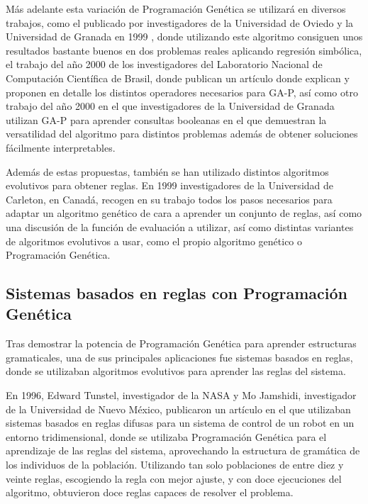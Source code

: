 Más adelante esta variación de Programación Genética se utilizará en diversos trabajos, como el publicado por investigadores de la Universidad de Oviedo y la Universidad de Granada en 1999 \cite{GAPredElectrica}, donde utilizando este algoritmo consiguen unos resultados bastante buenos en dos problemas reales aplicando regresión simbólica, el trabajo del año 2000 de los investigadores del Laboratorio Nacional de Computación Científica de Brasil, donde publican un artículo \cite{PGregresionSimbolica} donde explican y proponen en detalle los distintos operadores necesarios para GA-P, así como otro trabajo del año 2000 en el que investigadores de la Universidad de Granada utilizan GA-P para aprender consultas booleanas \cite{GAPFormulasBooleanas} en el que demuestran la versatilidad del algoritmo para distintos problemas además de obtener soluciones fácilmente interpretables.

Además de estas propuestas, también se han utilizado distintos algoritmos evolutivos para obtener reglas. En 1999 investigadores de la Universidad de Carleton, en Canadá, recogen en su trabajo \cite{reglasUsandoGeneticos} todos los pasos necesarios para adaptar un algoritmo genético de cara a aprender un conjunto de reglas, así como una discusión de la función de evaluación a utilizar, así como distintas variantes de algoritmos evolutivos a usar, como el propio algoritmo genético o Programación Genética.


\subsection{Sistemas basados en reglas con Programación Genética}


Tras demostrar la potencia de Programación Genética para aprender estructuras gramaticales, una de sus principales aplicaciones fue sistemas basados en reglas, donde se utilizaban algoritmos evolutivos para aprender las reglas del sistema.

En 1996, Edward Tunstel, investigador de la NASA y Mo Jamshidi, investigador de la Universidad de Nuevo México, publicaron un artículo \cite{PGcontrolRobots} en el que utilizaban sistemas basados en reglas difusas para un sistema de control de un robot en un entorno tridimensional, donde se utilizaba Programación Genética para el aprendizaje de las reglas del sistema, aprovechando la estructura de gramática de los individuos de la población. Utilizando tan solo poblaciones de entre diez y veinte reglas, escogiendo la regla con mejor ajuste, y con doce ejecuciones del algoritmo, obtuvieron doce reglas capaces de resolver el problema.

